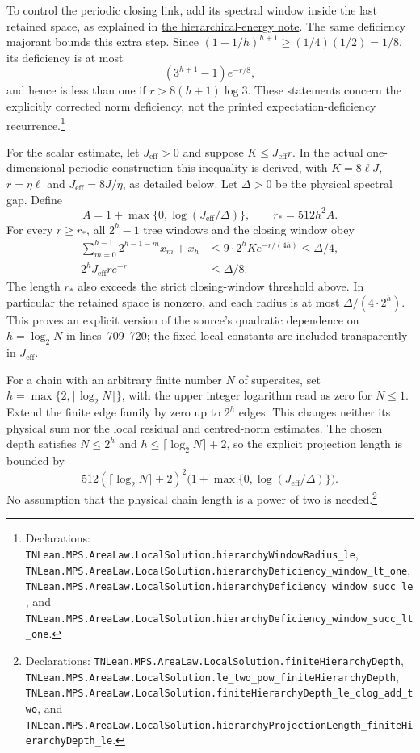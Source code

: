 \documentclass{article}
\providecommand{\leanid}[1]{\nolinkurl{#1}}
\begin{document}
To control the periodic closing link, add its spectral window inside
the last retained space, as explained in
\href{hastings05_hierarchical_energy.pdf}{the hierarchical-energy note}.
The same deficiency majorant bounds this extra step. Since
$(1-1/h)^{h+1}\ge(1/4)(1/2)=1/8$, its deficiency is at most
\[
 (3^{h+1}-1)e^{-r/8},
\]
and hence is less than one if $r>8(h+1)\log3$.
These statements concern the explicitly corrected norm deficiency,
not the printed expectation-deficiency recurrence.\footnote{Declarations:
\leanid{TNLean.MPS.AreaLaw.LocalSolution.hierarchyWindowRadius_le},
\leanid{TNLean.MPS.AreaLaw.LocalSolution.hierarchyDeficiency_window_lt_one},
\leanid{TNLean.MPS.AreaLaw.LocalSolution.hierarchyDeficiency_window_succ_le}, and
\leanid{TNLean.MPS.AreaLaw.LocalSolution.hierarchyDeficiency_window_succ_lt_one}.}

For the scalar estimate, let $J_{\mathrm{eff}}>0$ and suppose
$K\le J_{\mathrm{eff}}r$. In the actual one-dimensional periodic construction
this inequality is derived, with $K=8\ell J$, $r=\eta\ell$ and
$J_{\mathrm{eff}}=8J/\eta$, as detailed below. Let
$\Delta>0$ be the physical spectral gap. Define
\[
 A=1+\max\{0,\log(J_{\mathrm{eff}}/\Delta)\},\qquad
 r_*=512h^2 A.
\]
For every $r\ge r_*$, all $2^h-1$ tree windows and the closing window
obey
\begin{align*}
 \sum_{m=0}^{h-1}2^{h-1-m}x_m+x_h
   &\le9\cdot2^hK e^{-r/(4h)}\le\Delta/4,\\
 2^hJ_{\mathrm{eff}}r e^{-r}&\le\Delta/8.
\end{align*}
The length $r_*$ also exceeds the strict closing-window threshold above.
In particular the retained space is nonzero, and each radius is at most
$\Delta/(4\cdot2^h)$. This proves an explicit version of the source's
quadratic dependence on $h=\log_2N$ in lines~709--720; the fixed local
constants are included transparently in $J_{\mathrm{eff}}$.

For a chain with an arbitrary finite number $N$ of supersites, set
$h=\max\{2,\lceil\log_2 N\rceil\}$, with the upper integer logarithm
read as zero for $N\le1$. Extend the finite edge family by zero up to
$2^h$ edges. This changes neither its physical sum nor the local
residual and centred-norm estimates. The chosen depth satisfies
$N\le2^h$ and $h\le\lceil\log_2N\rceil+2$, so the explicit projection
length is bounded by
\[
 512(\lceil\log_2N\rceil+2)^2
 \bigl(1+\max\{0,\log(J_{\mathrm{eff}}/\Delta)\}\bigr).
\]
No assumption that the physical chain length is a power of two is
needed.\footnote{Declarations:
\leanid{TNLean.MPS.AreaLaw.LocalSolution.finiteHierarchyDepth},
\leanid{TNLean.MPS.AreaLaw.LocalSolution.le_two_pow_finiteHierarchyDepth},
\leanid{TNLean.MPS.AreaLaw.LocalSolution.finiteHierarchyDepth_le_clog_add_two}, and
\leanid{TNLean.MPS.AreaLaw.LocalSolution.hierarchyProjectionLength_finiteHierarchyDepth_le}.}
\end{document}
